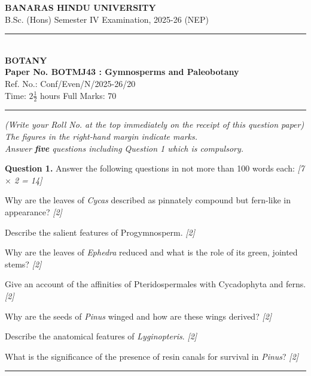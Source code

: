 \documentclass[11pt,a4paper]{article}
\newcommand{\pts}[1]{\hfill \textit{[#1]}}
\begin{document}
\begin{center}
  {\large\bfseries BANARAS HINDU UNIVERSITY}\\[2pt]
  {\normalsize B.Sc. (Hons) Semester IV Examination, 2025-26 (NEP)}\\[6pt]
  \rule{0.8\linewidth}{0.5pt}\\[6pt]
  {\large\bfseries BOTANY}\\[4pt]
  {\large\bfseries Paper No. BOTMJ43 : Gymnosperms and Paleobotany}\\[2pt]
  {\small Ref. No.: Conf/Even/N/2025-26/20}\\[4pt]
  {\normalsize Time: $2\frac{1}{2}$ hours \hfill Full Marks: 70}
\end{center}

\rule{\linewidth}{0.4pt}

\smallskip

\noindent \textit{(Write your Roll No. at the top immediately on the receipt of this question paper)}\\[2pt]
\noindent \textit{The figures in the right-hand margin indicate marks.}\\[1pt]
\noindent \textit{Answer \textbf{five} questions including Question 1 which is compulsory.}

\bigskip

\noindent \textbf{Question 1.} Answer the following questions in not more than 100 words each: \pts{7 $\times$ 2 = 14}
\begin{parts}
  \item Why are the leaves of \textit{Cycas} described as pinnately compound but fern-like in appearance? \pts{2}
  \item Describe the salient features of Progymnosperm. \pts{2}
  \item Why are the leaves of \textit{Ephedra} reduced and what is the role of its green, jointed stems? \pts{2}
  \item Give an account of the affinities of Pteridospermales with Cycadophyta and ferns. \pts{2}
  \item Why are the seeds of \textit{Pinus} winged and how are these wings derived? \pts{2}
  \item Describe the anatomical features of \textit{Lyginopteris}. \pts{2}
  \item What is the significance of the presence of resin canals for survival in \textit{Pinus}? \pts{2}
\end{parts}

\bigskip
\rule{\linewidth}{0.2pt}
\bigskip
\end{document}
